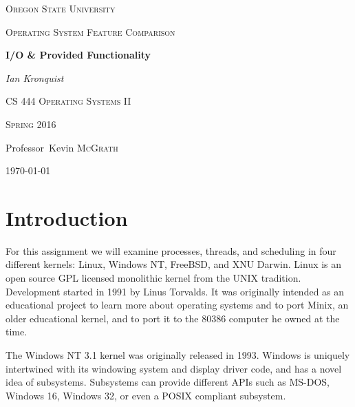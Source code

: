 \documentclass[10pt,conference,draftclsnofoot,onecolumn]{IEEEtran}
\begin{document}
\begin{titlepage}
    \centering
    {\scshape\LARGE Oregon State University \par}
    \vspace{1cm}
    \vspace{1cm}
    {\scshape\Large Operating System Feature Comparison \par}
    \vspace{1.5cm}
    {\huge\bfseries I/O \& Provided Functionality \par}
    \vspace{2cm}
    {\Large\itshape Ian Kronquist \par}
    \vfill
    \par
    {\scshape\Large CS 444 Operating Systems II \par}
    {\scshape\Large Spring 2016\par}

    \vspace{3cm}
    Professor~Kevin \textsc{McGrath}
    \vfill

    {\large \today\par}
\end{titlepage}


\author{
}

\bigskip

\section{Introduction}
For this assignment we will examine processes, threads, and scheduling in four different kernels: Linux, Windows NT, FreeBSD, and XNU Darwin.
Linux is an open source GPL licensed monolithic kernel from the UNIX tradition. Development started in 1991 by Linus Torvalds. It was originally intended as an educational project to learn more about operating systems and to port Minix, an older educational kernel, and to port it to the 80386 computer he owned at the time\cite{1_love_2010}.

The Windows NT 3.1 kernel was originally released in 1993. Windows is uniquely intertwined with its windowing system and display driver code, and has a novel idea of subsystems. Subsystems can provide different APIs such as MS-DOS, Windows 16, Windows 32, or even a POSIX compliant subsystem\cite{2_russinovich_solomon_ionescu_2012}.
\end{document}
